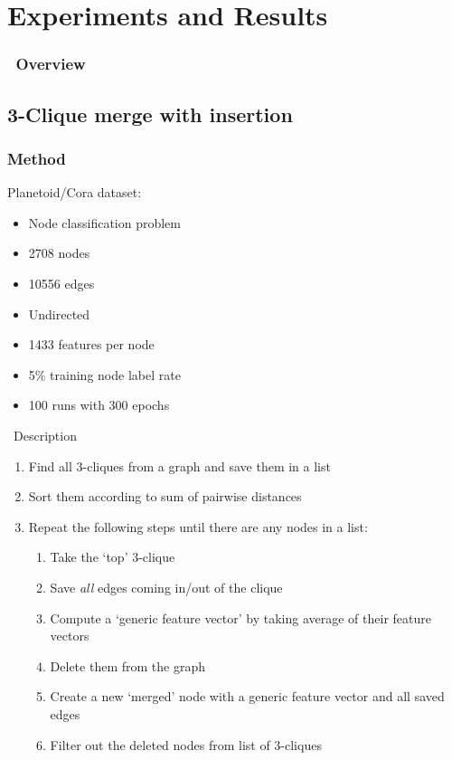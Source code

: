 \section{Experiments and Results}

\begin{frame}
	\frametitle{\secname\ Overview}
	\tableofcontents[currentsection]
\end{frame}

\subsection{3-Clique merge with insertion}
\begin{frame}
	\frametitle{Method}
	Planetoid/Cora dataset:

	\begin{itemize}
		\item Node classification problem
		\item 2708 nodes
		\item 10556 edges
		\item Undirected
		\item 1433 features per node
		\item 5\% training node label rate
		\item 100 runs with 300 epochs
	\end{itemize}
\end{frame}

\begin{frame}{\subsecname\ Description}
	\begin{enumerate}
		\item Find all 3-cliques from a graph and save them in a list
		\item Sort them according to sum of pairwise distances
		\item Repeat the following steps until there are any nodes in a list:
		      \begin{enumerate}
			      \item Take the `top' 3-clique
			      \item Save \emph{all} edges coming in/out of the clique
			      \item Compute a `generic feature vector' by taking average of their feature vectors
			      \item Delete them from the graph
			      \item Create a new `merged' node with a generic feature vector and all saved edges
			      \item Filter out the deleted nodes from list of 3-cliques
		      \end{enumerate}
	\end{enumerate}
\end{frame}

